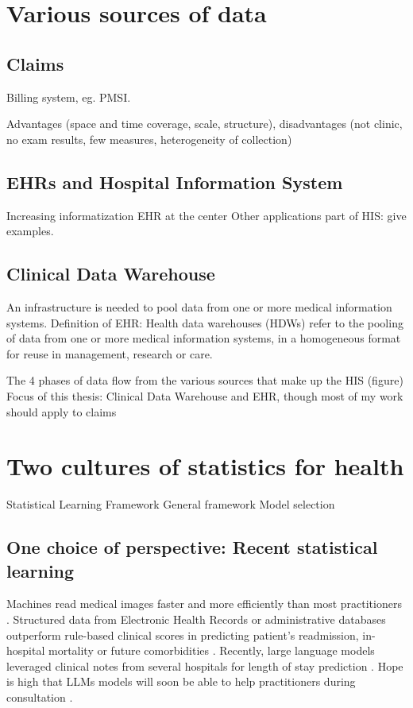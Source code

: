 \documentclass{report}
\begin{document}
\section{Various sources of data}\label{sec:intro:sources}

\subsection{Claims}\label{subsec:intro:claims}

Billing system, eg. PMSI.

Advantages (space and time coverage, scale, structure), disadvantages (not clinic, no exam results, few measures, heterogeneity of collection)

\subsection{EHRs and Hospital Information System}\label{subsec:intro:EHRs}

Increasing informatization
EHR at the center
Other applications part of HIS: give examples.

\subsection{Clinical Data Warehouse}\label{subsec:intro:cdw}
An infrastructure is needed to pool data from one or more medical information systems.
Definition of EHR: Health data warehouses (HDWs) refer to the pooling of data from one or more medical information systems, in a homogeneous format for reuse in management, research or care.


The 4 phases of data flow from the various sources that make up the HIS (figure)
Focus of this thesis: Clinical Data Warehouse and EHR, though most of my work should apply to claims

\section{Two cultures of statistics for health}\label{sec:two_cultures}

Statistical Learning Framework
General framework
Model selection
\subsection{One choice of perspective: Recent statistical learning}\label{subsec:intro:recent_statistical_learning}
Machines read medical images faster
and more efficiently than most practitioners \citep{zhou2021review}.
Structured data from Electronic Health Records \citep{rajkomar2018scalable} or
administrative databases \citep{beaulieu2021machine} outperform rule-based
clinical scores in predicting patient's readmission, in-hospital mortality or
future comorbidities \citep{li2020behrt}. Recently, large language models
leveraged clinical notes from several hospitals for length of stay prediction
\citep{jiang2023health}. Hope is high that LLMs models will soon be able to
help practitioners during consultation \citep{lee2023benefits}.
\end{document}
